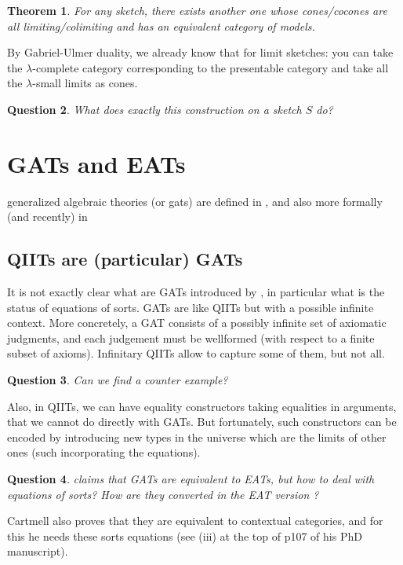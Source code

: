 \documentclass{article}
\newcommand{\Set}{\text{Set}}
\newtheorem{theorem}{Theorem}[section]
\newtheorem{question}[theorem]{Question}
\begin{document}
\begin{theorem}
  \cite[Corollary 2.62]{adamek_rosicky}
  For any sketch, there exists another one whose cones/cocones are all
  limiting/colimiting and has an equivalent category of models.
\end{theorem}
By Gabriel-Ulmer duality, we already know that for limit sketches: you can
take the $\lambda$-complete category corresponding to the presentable category
and take all the $\lambda$-small limits as cones.
\begin{question}
 What does exactly this construction on a sketch $S$ do? 
\end{question}
\section{GATs and EATs}
generalized algebraic theories (or gats) are defined in \cite{CARTMELL}, and
also more formally (and recently) in \cite{combinatorial-structure}


\subsection{QIITs are (particular) GATs}
It is not exactly clear what are GATs introduced by \cite{CARTMELL}, in particular what is the status of
equations of sorts.
GATs are like QIITs but with a possible infinite context. More concretely, a GAT
consists of a possibly infinite set of axiomatic judgments, and each judgement must be
wellformed (with respect to a finite subset of axioms).
Infinitary QIITs allow to capture some of them, but not all.
\begin{question}
Can we find a
counter example?
\end{question}

Also, in QIITs, we can have equality constructors taking equalities in
arguments, that we cannot do directly with GATs. But fortunately, such constructors can be encoded
by introducing new types in the universe which are the limits of other ones
(such incorporating the equations).
\begin{question}
\cite{CARTMELL}  claims that GATs are equivalent to EATs, but how to deal with
equations of sorts? How are they converted in the EAT version ?
\end{question}
Cartmell also proves
that they are equivalent to contextual categories, and for this he needs these
sorts equations
(see (iii) at the
top of p107 of his PhD manuscript).
\end{document}
